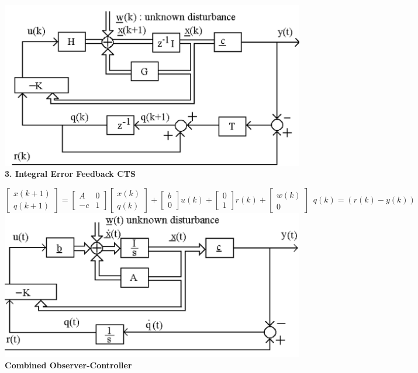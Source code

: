 \begin{multicols*}{3}
\includegraphics[width=\linewidth]{DiscreteIntegralTracking.png}
\textbf{3. Integral Error Feedback CTS} 

$ \begin{bmatrix} x(k+1) \\ q(k+1)\end{bmatrix} =
\begin{bmatrix}A & 0 \\ -c & 1\end{bmatrix}\begin{bmatrix}x(k) \\ q(k)\end{bmatrix}+
\begin{bmatrix}b \\ 0\end{bmatrix}u(k)+\begin{bmatrix} 0 \\ 1\end{bmatrix}r(k)+\begin{bmatrix}w(k) \\ 0\end{bmatrix} \ \
q(k)=(r(k)-y(k)) $
\includegraphics[width=\linewidth]{CTSIntegralTracking.png}
\textbf{Combined Observer-Controller}


\end{multicols*}
